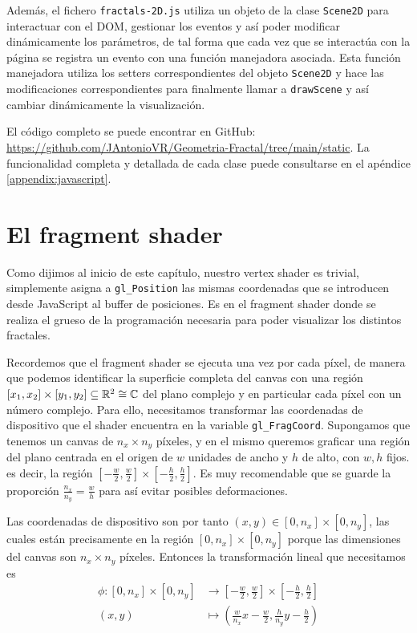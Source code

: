 Además, el fichero \verb|fractals-2D.js| utiliza un objeto de la clase \verb|Scene2D| para interactuar con el DOM, gestionar los eventos y así poder modificar dinámicamente los parámetros, de tal forma que cada vez que se interactúa con la página se registra un evento con una función manejadora asociada. Esta función manejadora utiliza los setters correspondientes del objeto \verb|Scene2D| y hace las modificaciones correspondientes para finalmente llamar a \verb|drawScene| y así cambiar dinámicamente la visualización.

El código completo se puede encontrar en GitHub: \url{https://github.com/JAntonioVR/Geometria-Fractal/tree/main/static}. La funcionalidad completa y detallada de cada clase puede consultarse en el apéndice \ref{appendix:javascript}.

\section{El fragment shader}
\label{section:fs-2D}

Como dijimos al inicio de este capítulo, nuestro vertex shader es trivial, simplemente asigna a \verb|gl_Position| las mismas coordenadas que se introducen desde JavaScript al buffer de posiciones. Es en el fragment shader donde se realiza el grueso de la programación necesaria para poder visualizar los distintos fractales.

Recordemos que el fragment shader se ejecuta una vez por cada píxel, de manera que podemos identificar la superficie completa del canvas con una región $[x_1,x_2]\times [y_1,y_2]\subseteq\mathbb{R}^2\cong\mathbb{C}$ del plano complejo y en particular cada píxel con un número complejo. Para ello, necesitamos transformar las coordenadas de dispositivo que el shader encuentra en la variable \verb|gl_FragCoord|. Supongamos que tenemos un canvas de $n_x\times n_y$ píxeles, y en el mismo queremos graficar una región del plano centrada en el origen de $w$ unidades de ancho y $h$ de alto, con $w,h$ fijos. es decir, la región $\left[-\frac{w}{2},\frac{w}{2}\right]\times\left[-\frac{h}{2},\frac{h}{2}\right]$. Es muy recomendable que se guarde la proporción $\frac{n_x}{n_y}=\frac{w}{h}$ para así evitar posibles deformaciones.

Las coordenadas de dispositivo son por tanto $(x,y)\in[0,n_x]\times[0,n_y]$, las cuales están precisamente en la región $[0,n_x]\times[0,n_y]$ porque las dimensiones del canvas son $n_x\times n_y$ píxeles. Entonces la transformación lineal que necesitamos es 
\begin{equation}
\label{eq:transformacion-lineal-1}
\begin{split}
    \phi:[0,n_x]\times[0,n_y] & \longrightarrow \left[-\frac{w}{2},\frac{w}{2}\right]\times\left[-\frac{h}{2},\frac{h}{2}\right] \\
    (x,y) & \longmapsto \left(\frac{w}{n_x}x-\frac{w}{2},\frac{h}{n_y}y-\frac{h}{2}\right)
\end{split}
\end{equation}

